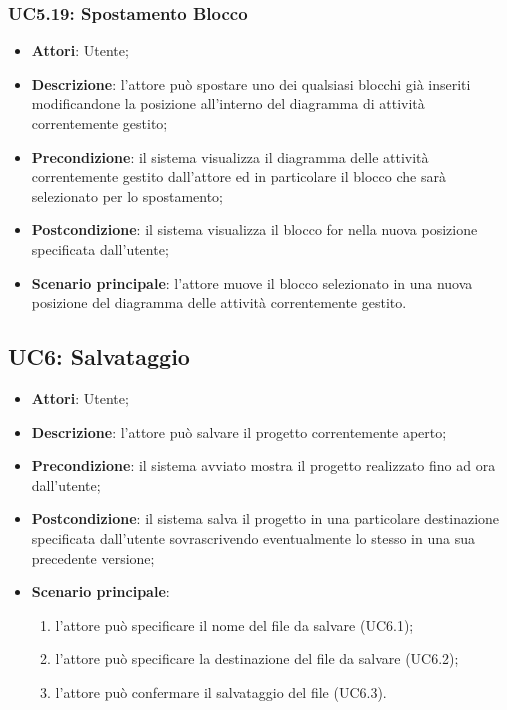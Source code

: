 \subsubsection{UC5.19: Spostamento Blocco}
\label{UC5.19}
\begin{itemize}
\item \textbf{Attori}: Utente;
\item \textbf{Descrizione}: l'attore può spostare uno dei qualsiasi blocchi già inseriti modificandone la posizione all'interno del diagramma di attività correntemente gestito;	
\item \textbf{Precondizione}: il sistema visualizza il diagramma delle attività correntemente gestito dall'attore ed in particolare il blocco che sarà selezionato per lo spostamento;	
\item \textbf{Postcondizione}: il sistema visualizza il blocco for nella nuova posizione specificata dall'utente;	
\item \textbf{Scenario principale}:
l'attore muove il blocco selezionato in una nuova posizione del diagramma delle attività correntemente gestito.	
\end{itemize}

\subsection{UC6: Salvataggio}
\label{UC6}
\begin{itemize}
\item \textbf{Attori}: Utente;
\item \textbf{Descrizione}: l'attore può salvare il progetto correntemente aperto;
\item \textbf{Precondizione}: il sistema avviato mostra il progetto realizzato fino ad ora dall'utente;
\item \textbf{Postcondizione}: il sistema salva il progetto in una particolare destinazione specificata dall'utente sovrascrivendo eventualmente lo stesso in una sua precedente versione;
\item \textbf{Scenario principale}:
\begin{enumerate}
\item l'attore può specificare il nome del file da salvare (UC6.1);
\item l'attore può specificare la destinazione del file da salvare (UC6.2);
\item l'attore può confermare il salvataggio del file (UC6.3).
\end{enumerate}
\end{itemize}

